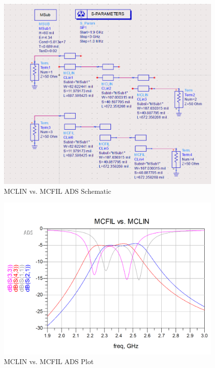 \documentclass{article}
\begin{document}
\begin{figure}[h!]
    \centering
    \includegraphics[scale=0.4]{images/mcfil_vs_mclin_schematic.png}
    \caption{MCLIN vs. MCFIL ADS Schematic}
    \label{fig:22}
\end{figure}
\begin{figure}[h!]
    \centering
    \includegraphics[scale=0.3]{images/mcfil_vs_mclin_plot.png}
    \caption{MCLIN vs. MCFIL ADS Plot}
    \label{fig:23}
\end{figure}
\end{document}
